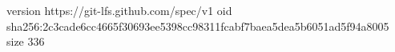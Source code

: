 version https://git-lfs.github.com/spec/v1
oid sha256:2c3cade6cc4665f30693ee5398cc98311fcabf7baea5dea5b6051ad5f94a8005
size 336
